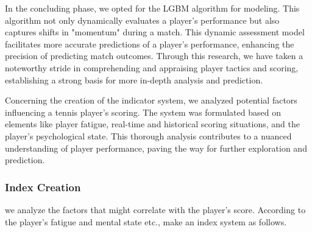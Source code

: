 \documentclass[12pt]{article}
\begin{document}
In the concluding phase, we opted for the LGBM algorithm for modeling. This algorithm not only dynamically evaluates a player's performance but also captures shifts in "momentum" during a match. This dynamic assessment model facilitates more accurate predictions of a player's performance, enhancing the precision of predicting match outcomes. Through this research, we have taken a noteworthy stride in comprehending and appraising player tactics and scoring, establishing a strong basis for more in-depth analysis and prediction.

Concerning the creation of the indicator system, we analyzed potential factors influencing a tennis player's scoring. The system was formulated based on elements like player fatigue, real-time and historical scoring situations, and the player's psychological state. This thorough analysis contributes to a nuanced understanding of player performance, paving the way for further exploration and prediction.

\subsubsection{Index Creation}
we analyze the factors that might correlate with the player's score. According to the player's fatigue and mental state etc., make an index system as follows.
\end{document}
